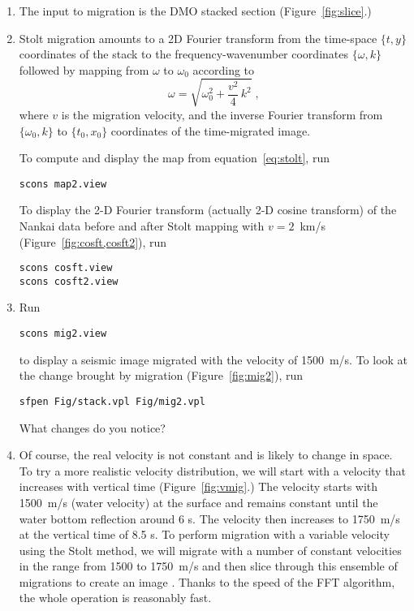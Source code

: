 \begin{enumerate}          
\item The input to migration is the DMO stacked section (Figure~\ref{fig:slice}.)
\item Stolt migration amounts to a 2D Fourier transform from the time-space $\{t,y\}$ coordinates of the stack 
to the frequency-wavenumber coordinates $\{\omega,k\}$ followed by mapping from $\omega$ to $\omega_0$ according to
\begin{equation}
\label{eq:stolt}
\omega = \sqrt{\omega_0^2 + \frac{v^2}{4}\,k^2}\;,
\end{equation}
where $v$ is the migration velocity, and the inverse Fourier transform
from $\{\omega_0,k\}$ to $\{t_0,x_0\}$ coordinates of the
time-migrated image.

To compute and display the map from equation~\ref{eq:stolt}, run
\begin{verbatim}
scons map2.view
\end{verbatim}

To display the 2-D Fourier transform (actually 2-D cosine transform)
of the Nankai data before and after Stolt mapping with
$v=2$~km/s (Figure~\ref{fig:cosft,cosft2}), run
\begin{verbatim}
scons cosft.view
scons cosft2.view
\end{verbatim}

	

\item Run
\begin{verbatim}
scons mig2.view
\end{verbatim}
to display a seismic image migrated with the velocity of 1500~m/s. To look at the change brought by migration (Figure~\ref{fig:mig2}), run
\begin{verbatim}
sfpen Fig/stack.vpl Fig/mig2.vpl
\end{verbatim}
What changes do you notice?

\answer{%

}

\item Of course, the real velocity is not constant and is likely to change in space. To try a more realistic velocity distribution, 
we will start with a velocity that increases with vertical time (Figure~\ref{fig:vmig}.) The velocity starts with 1500~m/s (water velocity) 
at the surface and remains constant until the water bottom reflection around 6 s. The velocity then increases 
to 1750~m/s at the vertical time of 8.5 s. To perform migration with a variable velocity using the Stolt method, 
we will migrate with a number of constant velocities in the range from 1500 to 1750~m/s and then slice through this 
ensemble of migrations to create an image \cite[]{GEO57-01-00510059}. Thanks to the speed of the FFT algorithm, 
the whole operation is reasonably fast.


\end{enumerate}
